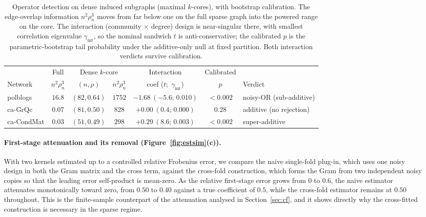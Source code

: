 \documentclass[12pt]{article}
\newcommand{\1}{\mathbf{1}}
\begin{document}
\begin{table}[t]
\centering
\small
\caption{Operator detection on dense induced subgraphs (maximal $k$-cores), with bootstrap calibration. The edge-overlap information $n^2\rho_n^3$ moves from far below one on the full sparse graph into the powered range on the core. The interaction (community $\times$ degree) design is near-singular there, with smallest correlation eigenvalue $\gamma_{\mathrm{int}}$, so the nominal sandwich $t$ is anti-conservative; the calibrated $p$ is the parametric-bootstrap tail probability under the additive-only null at fixed partition. Both interaction verdicts survive calibration.}
\label{tab:denseop}
\setlength{\tabcolsep}{4pt}
\begin{tabular}{lcccccl}
\toprule
& Full & \multicolumn{2}{c}{Dense $k$-core} & Interaction & Calibrated & \\
Network & $n^2\rho_n^3$ & $(n,\rho)$ & $n^2\rho_n^3$ & coef ($t$;\ $\gamma_{\mathrm{int}}$) & $p$ & Verdict\\
\midrule
\textsf{polblogs} & $16.8$ & $(82,0.64)$ & $1752$ & $-1.68\ (-5.6;\,0.010)$ & $<0.002$ & noisy-OR (sub-additive)\\
\textsf{ca-GrQc} & $0.07$ & $(81,0.50)$ & $828$ & $+0.00\ (0.4;\,0.000)$ & $0.28$ & additive (no rejection)\\
\textsf{ca-CondMat} & $0.03$ & $(51,0.49)$ & $298$ & $+0.29\ (8.6;\,0.003)$ & $<0.002$ & super-additive\\
\bottomrule
\end{tabular}
\end{table}

\paragraph{First-stage attenuation and its removal (Figure~\ref{fig:estsim}(c)).}
With two kernels estimated up to a controlled relative Frobenius error, we compare the naive
single-fold plug-in, which uses one noisy design in both the Gram matrix and the cross term, against
the cross-fold construction, which forms the Gram from two independent noisy copies so that the
leading error self-product is mean-zero. As the relative first-stage error grows from $0$ to $0.6$,
the naive estimator attenuates monotonically toward zero, from $0.50$ to $0.40$ against a true
coefficient of $0.5$, while the cross-fold estimator remains at $0.50$ throughout. This is the
finite-sample counterpart of the attenuation analysed in Section~\ref{sec:cf}, and it shows directly
why the cross-fitted construction is necessary in the sparse regime.
\end{document}
